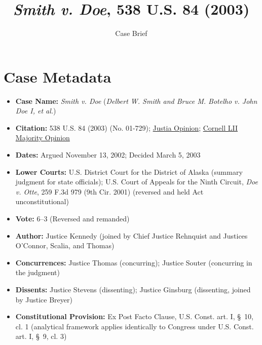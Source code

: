 \documentclass[12pt]{article}
\title{\textit{Smith v. Doe}, 538 U.S. 84 (2003)}
\author{Case Brief}
\date{}
\begin{document}
\maketitle

\section{Case Metadata}
\begin{itemize}
  \item \textbf{Case Name:} \textit{Smith v. Doe} (\textit{Delbert W. Smith and Bruce M. Botelho v. John Doe I, et al.})
  \item \textbf{Citation:} 538 U.S. 84 (2003) (No. 01-729); \href{https://supreme.justia.com/cases/federal/us/538/84/}{Justia Opinion}; \href{https://www.law.cornell.edu/supct/html/01-729.ZO.html}{Cornell LII Majority Opinion}
  \item \textbf{Dates:} Argued November 13, 2002; Decided March 5, 2003
  \item \textbf{Lower Courts:} U.S. District Court for the District of Alaska (summary judgment for state officials); U.S. Court of Appeals for the Ninth Circuit, \textit{Doe v. Otte}, 259 F.3d 979 (9th Cir. 2001) (reversed and held Act unconstitutional)
  \item \textbf{Vote:} 6--3 (Reversed and remanded)
  \item \textbf{Author:} Justice Kennedy (joined by Chief Justice Rehnquist and Justices O'Connor, Scalia, and Thomas)
  \item \textbf{Concurrences:} Justice Thomas (concurring); Justice Souter (concurring in the judgment)
  \item \textbf{Dissents:} Justice Stevens (dissenting); Justice Ginsburg (dissenting, joined by Justice Breyer)
  \item \textbf{Constitutional Provision:} Ex Post Facto Clause, U.S. Const. art. I, \S\ 10, cl. 1 (analytical framework applies identically to Congress under U.S. Const. art. I, \S\ 9, cl. 3)
\end{itemize}
\end{document}
